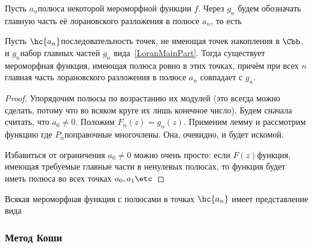 \documentclass[a4paper]{article}
\begin{document}
Пусть $a_n$\т полюса некоторой мероморфной функции $f$. Через $g_n$ будем обозначать
главную часть её лорановского разложения в полюсе $a_n$, то есть

\begin{theorem}
Пусть $\hc{a_n}$\т последовательность точек, не имеющая точек накопления в $\Cbb$, и $g_n$\т набор
главных частей $g_n$ вида~\eqref{LoranMainPart}. Тогда существует
мероморфная функция, имеющая полюса ровно в этих точках, причём при всех $n$ главная часть лорановского
разложения в полюсе $a_n$ совпадает с $g_n$.
\end{theorem}
\begin{proof}
Упорядочим полюсы по возрастанию их модулей (это всегда можно сделать, потому что
во всяком круге их лишь конечное число).
Будем сначала считать, что $a_0 \neq 0$. Положим $F_n(z) = g_n(z)$. Применим лемму и рассмотрим
функцию
где $P_n$\т поправочные многочлены. Она, очевидно, и будет искомой.

Избавиться от ограничения $a_0 \neq 0$ можно очень просто: если $F(z)$\т функция, имеющая требуемые
главные части в ненулевых полюсах, то функция
будет иметь полюса во всех точках $a_0,a_1\etc$
\end{proof}

\begin{imp}
Всякая мероморфная функция с полюсами в точках $\hc{a_n}$ имеет представление вида
\end{imp}

\subsubsection{Метод Коши}
\end{document}

